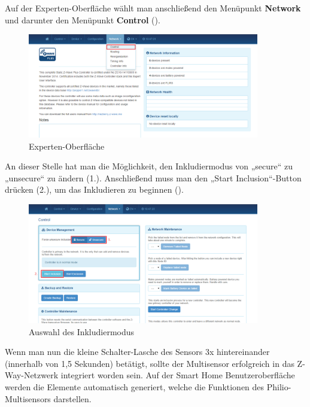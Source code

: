 Auf der Experten-Oberfläche wählt man anschließend den Menüpunkt \textbf{Network} und darunter den Menüpunkt \textbf{Control} ().

\begin{figure}[h!]
	\centering
	\includegraphics[width=0.9\textwidth]{img/Sensorevaluation/PhilioConf3.png}
	\caption{Experten-Oberfläche}
	\label{fig:sensorenPhilioConf3}
\end{figure}

An dieser Stelle hat man die Möglichkeit, den Inkludiermodus von „secure“ zu „unsecure“ zu ändern (1.). Anschließend muss man den „Start Inclusion“-Button drücken (2.), um das Inkludieren zu beginnen (). 

\begin{figure}[h!]
	\centering
	\includegraphics[width=0.9\textwidth]{img/Sensorevaluation/PhilioConf4.png}
	\caption{Auswahl des Inkludiermodus}
	\label{fig:sensorenPhilioConf4}
\end{figure}

Wenn man nun die kleine Schalter-Lasche des Sensors 3x hintereinander (innerhalb von 1,5 Sekunden) betätigt, sollte der Multisensor erfolgreich in das Z-Way-Netzwerk integriert worden sein. Auf der Smart Home Benutzeroberfläche werden die Elemente automatisch generiert, welche die Funktionen des Philio-Multisensors darstellen.

